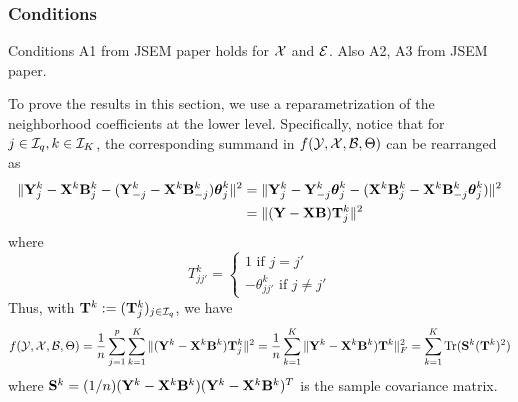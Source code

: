 \subsubsection{Conditions}
Conditions A1 from JSEM paper holds for ${\cal{X}}$ and ${\cal{E}}$. Also A2, A3 from JSEM paper.

To prove the results in this section, we use a reparametrization of the neighborhood coefficients at the lower level. Specifically, notice that for $j \in {\cal{I}}_q, k \in {\cal{I}}_K$, the corresponding summand in $f({\cal{Y}}, {\cal{X}}, {\cal{B}}, \Theta)$ can be rearranged as
%
\begin{align*}
\| {\mathbf{Y}}^k_j - {\mathbf{X}}^k {\mathbf{B}}_j^k - ({\mathbf{Y}}_{-j}^k - {\mathbf{X}}^k {\mathbf{B}}_{-j}^k) {\boldsymbol{\theta}}_j^k \|^2 &=
\| {\mathbf{Y}}^k_j - {\mathbf{Y}}_{-j}^k {\boldsymbol{\theta}}_j^k - ({\mathbf{X}}^k {\mathbf{B}}_j^k -{\mathbf{X}}^k {\mathbf{B}}_{-j}^k {\boldsymbol{\theta}}_j^k) \|^2 \\
&= \| ( {\mathbf{Y}} - {\mathbf{X}} {\mathbf{B}} ) {\mathbf{T}}_j^k \|^2
\end{align*}
%
where
%
$$
T_{jj'}^k = \begin{cases}
1 \text{ if } j = j'\\
- \theta_{jj'}^k \text{ if } j \neq j'
\end{cases}
$$
%
Thus, with ${\mathbf{T}}^k := ({\mathbf{T}}_j^k)_{j \in {\cal{I}}_q}$, we have
$$
f( {\cal{Y}}, {\cal{X}}, {\cal{B}}, \Theta) = \frac{1}{n} \sum_{j=1}^p \sum_{k=1}^K \| ( {\mathbf{Y}}^k - {\mathbf{X}}^k {\mathbf{B}}^k ) {\mathbf{T}}_j^k \|^2
= \frac{1}{n} \sum_{k=1}^K \| {\mathbf{Y}}^k - {\mathbf{X}}^k {\mathbf{B}}^k ) {\mathbf{T}}^k \|_F^2
= \sum_{k=1}^K \operatorname*{Tr} ({\mathbf{S}}^k ({\mathbf{T}}^k)^2 )
$$
%
where ${\mathbf{S}}^k = (1/n) ({\mathbf{Y}}^k - {\mathbf{X}}^k {\mathbf{B}}^k) ({\mathbf{Y}}^k - {\mathbf{X}}^k {\mathbf{B}}^k)^T$ is the sample covariance matrix.

